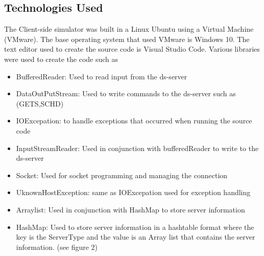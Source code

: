 \documentclass[a4paper]{article} %
\begin{document}
\subsection{Technologies Used}
The Client-side simulator was built in a Linux Ubuntu using a Virtual Machine (VMware). The base operating system that used VMware is Windows 10. The text editor used to create the source code is Visual Studio Code. Various libraries were used to create the code such as
\begin{itemize}
    \item BufferedReader: Used to read input from the ds-server
    \item DataOutPutStream: Used to write commands to the ds-server such as (GETS,SCHD)
    \item IOExcepation: to handle exceptions that occurred when running the source code
    \item InputStreamReader: Used in conjunction with bufferedReader to write to the ds-server
    \item Socket: Used for socket programming and managing the connection
    \item UknownHostException: same as IOExcepation used for exception handling
    \item Arraylist: Used in conjunction with HashMap to store server information\cite{W3SArrayList}
    \item HashMap: Used to store server information in a hashtable format where the key is the ServerType and the value is an Array list that contains the server information\cite{W3SHashmap}. (see figure 2)
\end{itemize}



\end{document}
